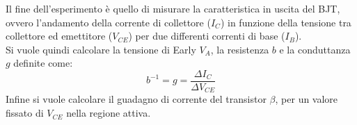 \documentclass[../main.tex]{subfiles}
\begin{document}
    Il fine dell'esperimento è quello di misurare la caratteristica in uscita del BJT,
    ovvero l'andamento della corrente di collettore ($I_C$) in funzione della tensione
    tra collettore ed emettitore ($V_{CE}$) per due differenti correnti di base ($I_B$). \\
    Si vuole quindi calcolare la tensione di Early $V_A$, la resistenza $b$ e la
    conduttanza $g$ definite come:
    \begin{equation}
        b^{-1} = g = \frac{\varDelta I_C}{\varDelta V_{CE}}
        \label{eq:g/b}
    \end{equation}
    Infine si vuole calcolare il guadagno di corrente del transistor
    $\beta$, per un valore fissato di $V_{CE}$ nella regione attiva.

\end{document}
